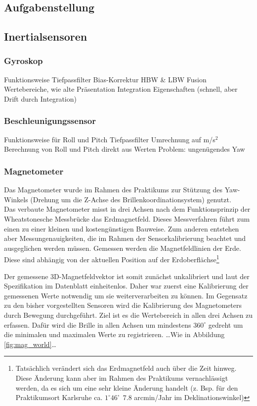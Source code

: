 
\subsection{Aufgabenstellung}


\subsection{Inertialsensoren}

\subsubsection{Gyroskop}
Funktionsweise
Tiefpassfilter
Bias-Korrektur
HBW \& LBW Fusion
Wertebereiche, wie alte Präsentation
Integration
Eigenschaften (schnell, aber Drift durch Integration)


\subsubsection{Beschleunigungssensor}
Funktionsweise
für Roll und Pitch
Tiefpassfilter
Umrechnung auf m/s$^2$
Berechnung von Roll und Pitch direkt aus Werten
Problem: ungenügendes Yaw


\subsubsection{Magnetometer}
Das Magnetometer wurde im Rahmen des Praktikums zur Stützung des Yaw-Winkels (Drehung um die Z-Achse des Brillenkoordinationsystem) genutzt.\\
Das verbaute Magnetometer misst in drei Achsen nach dem Funktionsprinzip der Wheatstonesche Messbrücke \cite{renaudin2010complete} das Erdmagnetfeld. Dieses Messverfahren führt zum einen zu einer kleinen und kostengünstigen Bauweise. Zum anderen entstehen aber Messungenauigkeiten, die im Rahmen der Sensorkalibrierung beachtet und ausgeglichen werden müssen. Gemessen werden die Magnetfeldlinien der Erde. Diese sind abhängig von der aktuellen Position auf der Erdoberflächse\footnote{Tatsächlich verändert sich das Erdmagnetfeld auch über die Zeit hinweg. Diese Änderung kann aber im Rahmen des Praktikums vernachlässigt werden, da es sich um eine sehr kleine Änderung handelt (z. Bsp. für den Praktikumsort Karlsruhe ca. $1^\circ 46$'~$7.8$ arcmin/Jahr im Deklinationswinkel)}

Der gemessene 3D-Magnetfeldvektor ist somit zunächst unkalibriert und laut der Spezifikation im Datenblatt  einheitenlos.
Daher war zuerst eine Kalibrierung der gemessenen Werte notwendig um sie weiterverarbeiten zu können. Im Gegensatz zu den bisher vorgestellten Sensoren wird die Kalibrierung des Magnetometers durch Bewegung durchgeführt. Ziel ist es die Wertebereich in allen drei Achsen zu erfassen. Dafür wird die Brille in allen Achsen um mindestens $360^\circ$ gedreht um die minimalen und maximalen Werte zu registrieren. \ldots Wie in Abbildung \ref{fig:mag_world}\ldots



